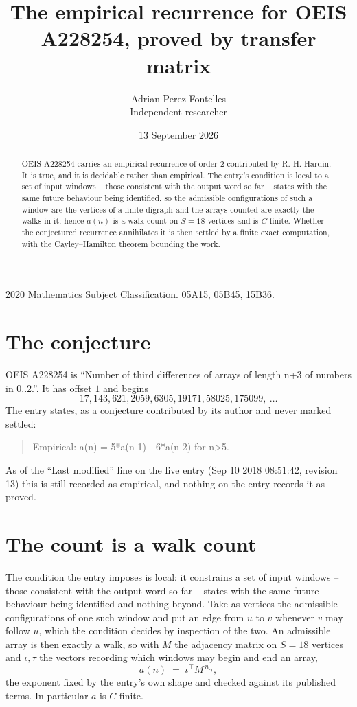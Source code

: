 \documentclass[11pt,a4paper]{article}
\title{The empirical recurrence for OEIS A228254, proved by transfer matrix}
\author{Adrian Perez Fontelles\\ \small Independent researcher}
\date{13 September 2026}
\theoremstyle{plain}
\theoremstyle{definition}
\begin{document}
\maketitle

\begin{abstract}
OEIS A228254 carries an empirical recurrence of order $2$ contributed by R. H. Hardin. It is
true, and it is decidable rather than empirical. The entry's condition is local to a set of input windows -- those consistent with the output word so far -- states with the same future behaviour being identified, so
the admissible configurations of such a window are the vertices of a finite digraph and the
arrays counted are exactly the walks in it; hence $a(n)$ is a walk count on $S=18$ vertices
and is $C$-finite. Whether the conjectured recurrence annihilates it is then settled by a
finite exact computation, with the Cayley--Hamilton theorem bounding the work.
\end{abstract}

\noindent\small 2020 Mathematics Subject Classification. 05A15, 05B45, 15B36.\normalsize

\section{The conjecture}

OEIS A228254 is ``Number of third differences of arrays of length n+3 of numbers in 0..2.''. It has offset $1$ and begins
\[
17, 143, 621, 2059, 6305, 19171, 58025, 175099,\ \dots
\]
The entry states, as a conjecture contributed by its author and never marked settled:
\begin{quote}
Empirical: a(n) = 5*a(n-1) - 6*a(n-2) for n>5.
\end{quote}
As of the ``Last modified'' line on the live entry (Sep 10 2018 08:51:42, revision 13) this is still
recorded as empirical, and nothing on the entry records it as proved.

\section{The count is a walk count}

The condition the entry imposes is local: it constrains a set of input windows -- those consistent with the output word so far -- states with the same future behaviour being identified and nothing beyond. Take as
vertices the admissible configurations of one such window and put an edge from $u$ to $v$
whenever $v$ may follow $u$, which the condition decides by inspection of the two. An
admissible array is then exactly a walk, so with $M$ the adjacency matrix on $S=18$ vertices
and $\iota,\tau$ the vectors recording which windows may begin and end an array,
\[
a(n)\;=\;\iota^{\!\top}M^{\,n}\tau ,
\]
the exponent fixed by the entry's own shape and checked against its published terms. In
particular $a$ is $C$-finite.
\end{document}
